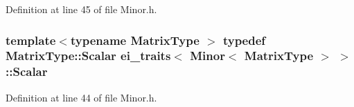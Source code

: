 Definition at line 45 of file Minor.\-h.

\hypertarget{structei__traits_3_01_minor_3_01_matrix_type_01_4_01_4_a0bf79498130c326b9c0765ac1938517a}{
\subsubsection[{Scalar}]{\setlength{\rightskip}{0pt plus 5cm}template$<$typename Matrix\-Type $>$ typedef Matrix\-Type\-::\-Scalar {\bf ei\-\_\-traits}$<$ {\bf Minor}$<$ Matrix\-Type $>$ $>$\-::{\bf Scalar}}}\label{structei__traits_3_01_minor_3_01_matrix_type_01_4_01_4_a0bf79498130c326b9c0765ac1938517a}


Definition at line 44 of file Minor.\-h.



